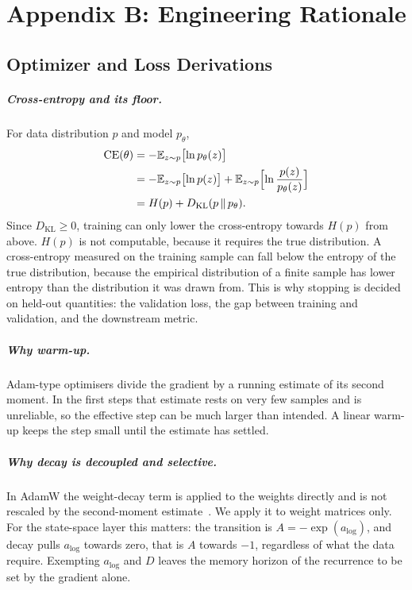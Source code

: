 \chapter{Appendix B: Engineering Rationale}
\label{chap:appendix_engineering}

\section{Optimizer and Loss Derivations}
\label{sec:app_derivations}

\paragraph{Cross-entropy and its floor.} For data distribution $p$ and model $p_\theta$,
\begin{align}
\mathrm{CE}(\theta) &= -\mathbb{E}_{z \sim p}\bigl[\ln p_\theta(z)\bigr] \\
&= -\mathbb{E}_{z \sim p}\bigl[\ln p(z)\bigr] + \mathbb{E}_{z \sim p}\Bigl[\ln \frac{p(z)}{p_\theta(z)}\Bigr] \\
&= H(p) + D_{\mathrm{KL}}(p \,\Vert\, p_\theta).
\end{align}
Since $D_{\mathrm{KL}} \ge 0$, training can only lower the cross-entropy towards $H(p)$ from above. $H(p)$ is not computable, because it requires the true distribution. A cross-entropy measured on the training sample can fall below the entropy of the true distribution, because the empirical distribution of a finite sample has lower entropy than the distribution it was drawn from. This is why stopping is decided on held-out quantities: the validation loss, the gap between training and validation, and the downstream metric.

\paragraph{Why warm-up.} Adam-type optimisers divide the gradient by a running estimate of its second moment. In the first steps that estimate rests on very few samples and is unreliable, so the effective step can be much larger than intended. A linear warm-up keeps the step small until the estimate has settled.

\paragraph{Why decay is decoupled and selective.} In AdamW the weight-decay term is applied to the weights directly and is not rescaled by the second-moment estimate~\cite{loshchilov2019adamw}. We apply it to weight matrices only. For the state-space layer this matters: the transition is $A = -\exp(a_{\log})$, and decay pulls $a_{\log}$ towards zero, that is $A$ towards $-1$, regardless of what the data require. Exempting $a_{\log}$ and $D$ leaves the memory horizon of the recurrence to be set by the gradient alone.

